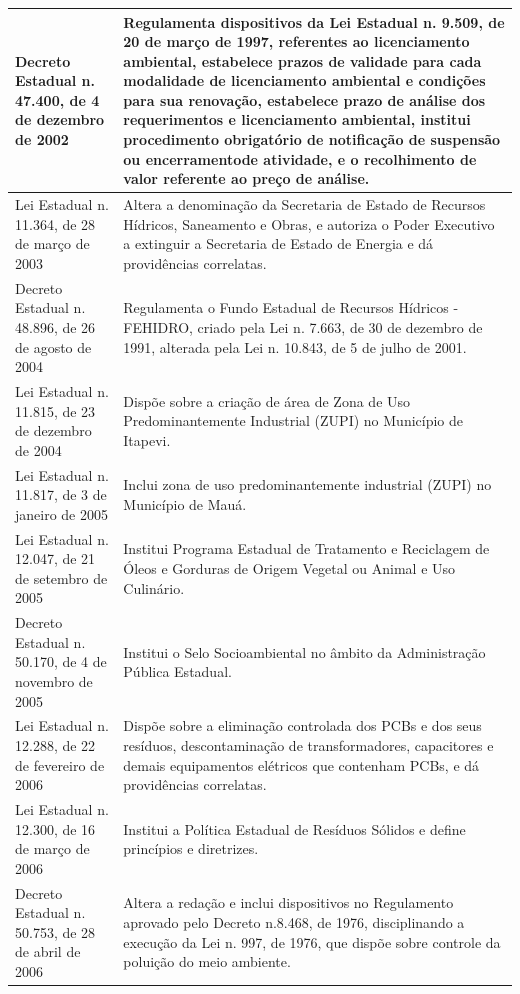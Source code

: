 \begin{center}
\begin{longtable}{|p{}|p{}|}
			\hline
			Decreto Estadual n. 47.400, de 4 de dezembro de 2002 & Regulamenta  dispositivos  da Lei  Estadual n.  9.509, de  20 de  março de  1997, referentes ao licenciamento ambiental, estabelece prazos de validade para cada modalidade   de   licenciamento   ambiental   e  condições   para   sua   renovação, estabelece  prazo  de  análise  dos  requerimentos  e  licenciamento  ambiental, institui procedimento obrigatório de notificação de suspensão ou encerramento\newline{}de atividade, e o recolhimento de valor referente ao preço de análise. \\
			\hline
			Lei  Estadual  n.  11.364,  de  28 de março de 2003 & Altera   a   denominação   da   Secretaria   de   Estado   de   Recursos   Hídricos, Saneamento e Obras, e autoriza o Poder Executivo a extinguir a Secretaria de Estado de Energia e dá providências correlatas. \\
			\hline
			Decreto Estadual n. 48.896, de 26 de agosto de 2004 & Regulamenta o Fundo Estadual de Recursos Hídricos  - FEHIDRO, criado pela Lei n. 7.663, de 30 de dezembro de 1991, alterada pela Lei n. 10.843, de 5 de julho de 2001. \\
			\hline
			Lei  Estadual  n.  11.815,  de  23 de dezembro de 2004 & Dispõe sobre a criação de área de Zona de Uso Predominantemente Industrial (ZUPI) no Município de Itapevi. \\
			\hline
			Lei Estadual n. 11.817, de 3 de janeiro de 2005 & Inclui zona de uso predominantemente industrial (ZUPI) no Município de Mauá. \\
			\hline
			Lei  Estadual  n.  12.047,  de  21 de setembro de 2005 & Institui Programa Estadual de Tratamento e Reciclagem de Óleos e Gorduras de Origem Vegetal ou Animal e Uso Culinário. \\
			\hline
			Decreto Estadual n. 50.170, de 4 de novembro de 2005 & Institui o Selo Socioambiental no âmbito da Administração Pública Estadual. \\
			\hline
			Lei  Estadual  n.  12.288,  de  22 de fevereiro de 2006 & Dispõe  sobre  a  eliminação  controlada  dos  PCBs  e  dos  seus  resíduos, descontaminação   de   transformadores,   capacitores   e   demais   equipamentos elétricos que contenham PCBs, e dá providências correlatas. \\
			\hline
			Lei  Estadual  n.  12.300,  de  16 de março de 2006 & Institui a Política Estadual de Resíduos Sólidos e define princípios e diretrizes. \\
			\hline
			Decreto Estadual n. 50.753, de 28 de abril de 2006 & Altera a redação e inclui dispositivos no Regulamento aprovado pelo Decreto n.\newline{}8.468, de 1976, disciplinando a execução da Lei n. 997, de 1976, que dispõe sobre controle da poluição do meio ambiente. \\

\end{longtable}
\end{center}
